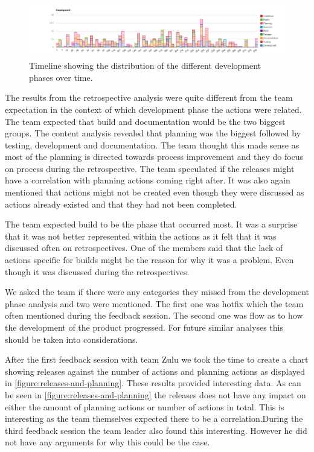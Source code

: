 \begin{figure}
	\centering
	\includegraphics[width=\textwidth, keepaspectratio]{figures/development-l.png}
	\caption{Timeline showing the distribution of the different development phases over time.}
	\label{figure:development-l}
\end{figure}
\afterpage{\clearpage}

The results from the retrospective analysis were quite different from the team expectation in the context of which development phase the actions were related. The team expected that build and documentation would be the two biggest groups. The content analysis revealed that planning was the biggest followed by testing, development and documentation. The team thought this made sense as most of the planning is directed towards process improvement and they do focus on process during the retrospective. The team speculated if the releases might have a correlation with planning actions coming right after. It was also again mentioned that actions might not be created even though they were discussed as actions already existed and that they had not been completed. 

The team expected build to be the phase that occurred most. It was a surprise that it was not better represented within the actions as it felt that it was discussed often on retrospectives. One of the members said that the lack of actions specific for builds might be the reason for why it was a problem. Even though it was discussed during the retrospectives.  

We asked the team if there were any categories they missed from the development phase analysis and two were mentioned. The first one was hotfix which the team often mentioned during the feedback session. The second one was flow as to how the development of the product progressed. For future similar analyses this should be taken into considerations. 

After the first feedback session with team Zulu we took the time to create a chart showing releases against the number of actions and planning actions as displayed in \autoref{figure:releases-and-planning}. These results provided interesting data. As can be seen in \autoref{figure:releases-and-planning} the releases does not have any impact on either the amount of planning actions or number of actions in total. This is interesting as the team themselves expected there to be a correlation.During the third feedback session the team leader also found this interesting. However he did not have any arguments for why this could be the case.

